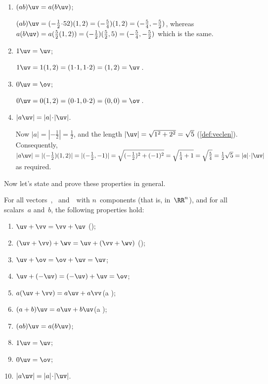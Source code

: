 \begin{example}
\begin{enumerate}
\item \((ab)\uv=a(b\uv)\);
\begin{solution} 
\((ab)\uv=(-\tfrac12\cdot52)(1,2)=(-\tfrac54)(1,2) =(-\tfrac54,-\tfrac52)\), whereas \(a(b\uv)=a(\tfrac52(1,2)) =(-\tfrac12)(\tfrac52,5) =(-\tfrac54,-\tfrac52)\) which is the same.
\end{solution}

\item \(1\uv=\uv\);
\begin{solution} 
\(1\uv=1(1,2)=(1\cdot1,1\cdot2)=(1,2)=\uv\)\,. 
\end{solution}

\item \(0\uv=\ov\);
\begin{solution} 
\(0\uv=0(1,2)=(0\cdot1,0\cdot2)=(0,0)=\ov\)\,. 
\end{solution}

\item \(|a\uv|=|a|\cdot|\uv|\).
\begin{solution} 
Now \(|a|=|-\tfrac12|=\tfrac12\), and the length \(|\uv|=\sqrt{1^2+2^2}=\sqrt5\) (\autoref{def:veclen}).
Consequently, \(|a\uv| =|(-\tfrac12)(1,2)| =|(-\tfrac12,-1)| =\sqrt{(-\tfrac12)^2+(-1)^2} =\sqrt{\tfrac14+1} =\sqrt{\tfrac54} =\tfrac12\sqrt5=|a|\cdot|\uv|\) as required.
\end{solution}

\end{enumerate}
\end{example}


Now let's state and prove these properties in general.


\begin{theorem} \label{thm:vecops}
For all vectors~\uv, \vv\ and~\wv\  with \(n\)~components (that is, in~\(\RR^n\)), and for all scalars~\(a\) and~\(b\),
the following properties hold:
\begin{enumerate}
\item\label{thm:vecopsa} \(\uv+\vv=\vv+\uv\) \quad();
\item\label{thm:vecopsb} \((\uv+\vv)+\wv=\uv+(\vv+\wv)\) \quad();
\item\label{thm:vecopsc} \(\uv+\ov=\ov+\uv=\uv\);
\item\label{thm:vecopsd} \(\uv+(-\uv)=(-\uv)+\uv=\ov\);
\item\label{thm:vecopse} \(a(\uv+\vv)=a\uv+a\vv\)\quad(a );
\item\label{thm:vecopsf} \((a+b)\uv=a\uv+b\uv\)\quad(a );
\item\label{thm:vecopsg} \((ab)\uv=a(b\uv)\);
\item\label{thm:vecopsh} \(1\uv=\uv\);
\item\label{thm:vecopsi} \(0\uv=\ov\);
\item\label{thm:vecopsj} \(|a\uv|=|a|\cdot|\uv|\).
\end{enumerate}
\end{theorem}

